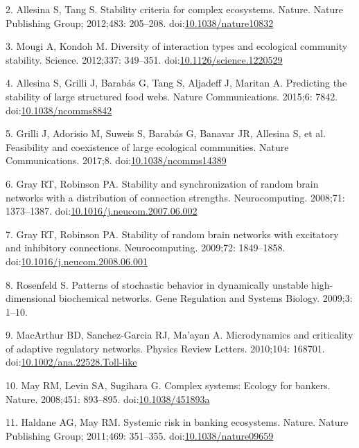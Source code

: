 \documentclass[]{article}
\begin{document}
\hypertarget{ref-Allesina2012}{}
2. Allesina S, Tang S. Stability criteria for complex ecosystems.
Nature. Nature Publishing Group; 2012;483: 205--208.
doi:\href{https://doi.org/10.1038/nature10832}{10.1038/nature10832}

\hypertarget{ref-Mougi2012}{}
3. Mougi A, Kondoh M. Diversity of interaction types and ecological
community stability. Science. 2012;337: 349--351.
doi:\href{https://doi.org/10.1126/science.1220529}{10.1126/science.1220529}

\hypertarget{ref-Allesina2015}{}
4. Allesina S, Grilli J, Barabás G, Tang S, Aljadeff J, Maritan A.
Predicting the stability of large structured food webs. Nature
Communications. 2015;6: 7842.
doi:\href{https://doi.org/10.1038/ncomms8842}{10.1038/ncomms8842}

\hypertarget{ref-Grilli2017}{}
5. Grilli J, Adorisio M, Suweis S, Barabás G, Banavar JR, Allesina S, et
al. Feasibility and coexistence of large ecological communities. Nature
Communications. 2017;8.
doi:\href{https://doi.org/10.1038/ncomms14389}{10.1038/ncomms14389}

\hypertarget{ref-Gray2008}{}
6. Gray RT, Robinson PA. Stability and synchronization of random brain
networks with a distribution of connection strengths. Neurocomputing.
2008;71: 1373--1387.
doi:\href{https://doi.org/10.1016/j.neucom.2007.06.002}{10.1016/j.neucom.2007.06.002}

\hypertarget{ref-Gray2009}{}
7. Gray RT, Robinson PA. Stability of random brain networks with
excitatory and inhibitory connections. Neurocomputing. 2009;72:
1849--1858.
doi:\href{https://doi.org/10.1016/j.neucom.2008.06.001}{10.1016/j.neucom.2008.06.001}

\hypertarget{ref-Rosenfeld2009}{}
8. Rosenfeld S. Patterns of stochastic behavior in dynamically unstable
high-dimensional biochemical networks. Gene Regulation and Systems
Biology. 2009;3: 1--10.

\hypertarget{ref-MacArthur2010}{}
9. MacArthur BD, Sanchez-Garcia RJ, Ma'ayan A. Microdynamics and
criticality of adaptive regulatory networks. Physics Review Letters.
2010;104: 168701.
doi:\href{https://doi.org/10.1002/ana.22528.Toll-like}{10.1002/ana.22528.Toll-like}

\hypertarget{ref-May2008}{}
10. May RM, Levin SA, Sugihara G. Complex systems: Ecology for bankers.
Nature. 2008;451: 893--895.
doi:\href{https://doi.org/10.1038/451893a}{10.1038/451893a}

\hypertarget{ref-Haldane2011}{}
11. Haldane AG, May RM. Systemic risk in banking ecosystems. Nature.
Nature Publishing Group; 2011;469: 351--355.
doi:\href{https://doi.org/10.1038/nature09659}{10.1038/nature09659}
\end{document}
